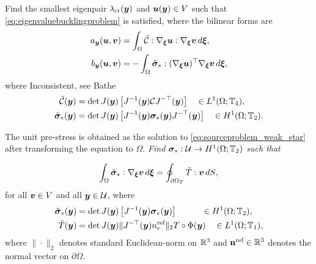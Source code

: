 \begin{problem}\label{problem:transformed_linearbuckling}
    Find the smallest eigenpair $\lambda_{\text{cr}}({\boldsymbol{y}})$ and ${\boldsymbol{u}}({\boldsymbol{y}}) \in V$ such that \eqref{eq:eigenvaluebucklingproblem} is satisfied, where the bilinear forms are
    \begin{align}\label{eq:bilinearforms}
    a_{\boldsymbol{y}}({\boldsymbol{u}}, {\boldsymbol{v}}) &=  \int_{\Omega} \tilde{\mathcal{C}} : \nabla_{{\boldsymbol{\xi}}} {\boldsymbol{u}} :\nabla_{{\boldsymbol{\xi}}} {\boldsymbol{v}} \mathop{d\boldsymbol{\xi}},  \\
    \label{eq:bilinearforms2}
    b_{\boldsymbol{y}}({\boldsymbol{u}}, {\boldsymbol{v}})  & = -\int_{\Omega}  \tilde{\boldsymbol{\sigma}}_* : (\nabla_{{\boldsymbol{\xi}}} {\boldsymbol{u}})^\top   \nabla_{{\boldsymbol{\xi}}} {\boldsymbol{v}}  \mathop{d\boldsymbol{\xi}},
\end{align}
where \ac{Inconsistent, see Bathe}
    \begin{align}\label{eq:transformed_stiffness}
    \tilde {\mathcal{C}}({\boldsymbol{y}})  &= \det J({\boldsymbol{y}}) \left [J^{-1}({\boldsymbol{y}})\mathcal{C} J^{-\top}({\boldsymbol{y}}) \right] \quad \in L^1(\Omega;\mathbb{T}_4),  \\
    \label{eq:transforme_prestress}
    \tilde{\boldsymbol{\sigma}}_*({\boldsymbol{y}}) &= \det J({\boldsymbol{y}})  \left[ J^{-1}({\boldsymbol{y}}) \boldsymbol{\sigma}_*({\boldsymbol{y}}) J^{-\top}({\boldsymbol{y}}) \right] \quad \in H^1(\Omega;\mathbb{T}_2).
    \end{align}
 
The unit pre-stress is obtained as the solution to \eqref{eq:sourceproblem_weak_star} after transforming the equation to $\Omega$. \emph{Find $\boldsymbol{\sigma}_* : \mathcal{U} \to H^1(\Omega;\mathbb{T}_2)$ such that} 

\begin{align}\label{eq:sourceproblem_weak_pulled_back}
    \int_{\Omega} \tilde {\boldsymbol{\sigma}}_* : \nabla_{{\boldsymbol{\xi}}} {\boldsymbol{v}} \mathop{d\boldsymbol{\xi}}  =  \oint_{\partial \Omega_T} \tilde T : {\boldsymbol{v}} \mathop{dS},
\end{align}
for all ${\boldsymbol{v}} \in V$ and all ${\boldsymbol{y}} \in \mathcal{U}$, where
\begin{align}
    \tilde {\boldsymbol{\sigma}}_*({\boldsymbol{y}}) &=  \det J({\boldsymbol{y}}) \left[ J^{-1}({\boldsymbol{y}}) \boldsymbol{\sigma}_{*}({\boldsymbol{y}})  \right] \quad \quad\quad \in H^1(\Omega;\mathbb{T}_2),  \\
    \tilde T({\boldsymbol{y}}) &=  \det J({\boldsymbol{y}})   \|J^{-\top}({\boldsymbol{y}}) n^{\text{ref}}_r \|_2  T\circ \Phi({\boldsymbol{y}}) \quad \in L^1(\Omega;\mathbb{T}_1),\label{eq:transformedtractionload}
\end{align}
where $\|  \cdot \|_2$ denotes standard Euclidean-norm on $\mathbb{R}^3$ and $\mathbf{n}^{\text{ref}} \in \mathbb{R}^3$ denotes the normal vector on $\partial \Omega$.
\end{problem}

